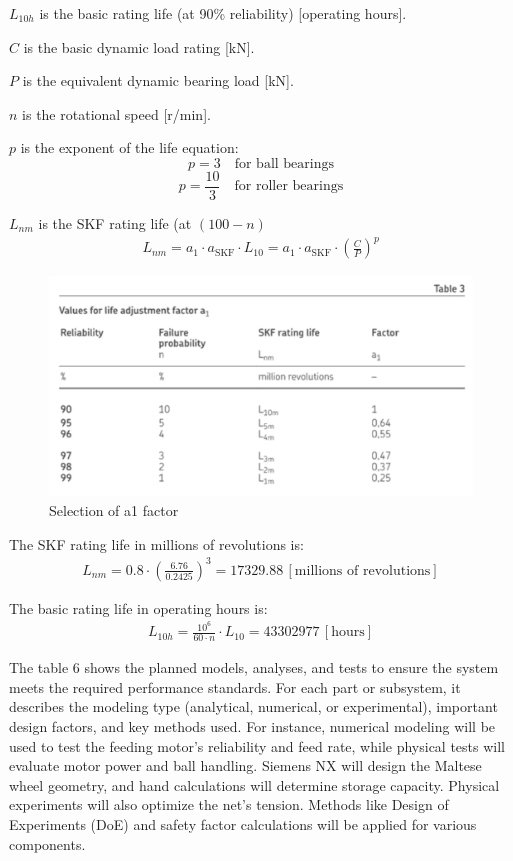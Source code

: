 \documentclass[12pt]{report}
\begin{document}
\( L_{10h} \) is the basic rating life (at 90\% reliability) [operating hours].

\( C \) is the basic dynamic load rating [kN].

\( P \) is the equivalent dynamic bearing load [kN].

\( n \) is the rotational speed [r/min].

\( p \) is the exponent of the life equation:
\[
p = 3 \quad \text{for ball bearings}
\]
\[
p = \frac{10}{3} \quad \text{for roller bearings}
\]

\( L_{nm} \) is the SKF rating life (at \( (100 - n) \)%
\begin{align}
L_{nm} = a_1 \cdot a_{\text{SKF}} \cdot L_{10} = a_1 \cdot a_{\text{SKF}} \cdot \left( \frac{C}{P} \right)^p
\end{align}

\begin{figure}[h!]
    \centering
    \includegraphics[width=0.5\linewidth]{table3.png}
    \caption{Selection of a1 factor}
    \label{fig:enter-label}
\end{figure}

The SKF rating life in millions of revolutions is:
\begin{align}
L_{nm} = 0.8 \cdot \left( \frac{6.76}{0.2425} \right)^3 = 17329.88 \, [\text{millions of revolutions}]
\end{align}

The basic rating life in operating hours is:
\begin{align}
L_{10h} = \frac{10^6}{60 \cdot n} \cdot L_{10} = 43302977 \, [\text{hours}]
\end{align}
 
The table 6 shows the planned models, analyses, and tests to ensure the system meets the required performance standards. For each part or subsystem, it describes the modeling type (analytical, numerical, or experimental), important design factors, and key methods used.  For instance, numerical modeling will be used to test the feeding motor’s reliability and feed rate, while physical tests will evaluate motor power and ball handling. Siemens NX will design the Maltese wheel geometry, and hand calculations will determine storage capacity. Physical experiments will also optimize the net’s tension. Methods like Design of Experiments (DoE) and safety factor calculations will be applied for various components. 
\end{document}
